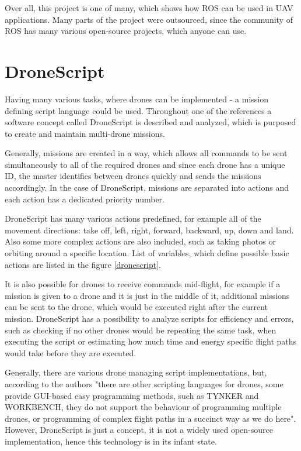 \documentclass[11pt,a4paper,footinclude=true,headinclude=true, oneside]{scrbook}
\begin{document}
Over all, this project is one of many, which shows how ROS can be used in UAV applications. Many parts of the project were outsourced, since the community of ROS has many various open-source projects, which anyone can use.


\section{DroneScript}

Having many various tasks, where drones can be implemented - a mission defining script language could be used. Throughout one of the references \cite{alwateer_enabling_2019} a software concept called DroneScript is described and analyzed, which is purposed to create and maintain multi-drone missions.

Generally, missions are created in a way, which allows all commands to be sent simultaneously to all of the required drones and since each drone has a unique ID, the master identifies between drones quickly and sends the missions accordingly. In the case of DroneScript, missions are separated into actions and each action has a dedicated priority number.

DroneScript has many various actions predefined, for example all of the movement directions: take off, left, right, forward, backward, up, down and land. Also some more complex actions are also included, such as taking photos or orbiting around a specific location. List of variables, which define possible basic actions are listed in the figure \ref{dronescript}.

It is also possible for drones to receive commands mid-flight, for example if a mission is given to a drone and it is just in the middle of it, additional missions can be sent to the drone, which would be executed right after the current mission. DroneScript has a possibility to analyze scripts for efficiency and errors, such as checking if no other drones would be repeating the same task, when executing the script or estimating how much time and energy specific flight paths would take before they are executed.

Generally, there are various drone managing script implementations, but, according to the authors \cite{alwateer_enabling_2019} "there are other scripting languages for drones, some provide GUI-based easy programming methods, such as TYNKER and WORKBENCH, they do not support the behaviour of programming multiple drones, or programming of complex flight paths in a succinct way as we do here". However, DroneScript is just a concept, it is not a widely used open-source implementation, hence this technology is in its infant state.
\end{document}
